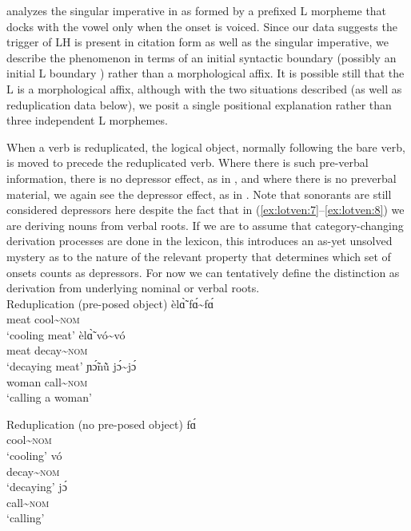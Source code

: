 \documentclass[output=paper,newtxmath,modfonts,nonflat,hidelinks]{langsci/langscibook}
\begin{document}
\citet{Bradshaw1999} analyzes the singular imperative in  as formed by a prefixed L  morpheme that docks with the vowel only when the onset is voiced. Since our data suggests the trigger of LH is present in citation form as well as the singular imperative, we describe the phenomenon in terms of an initial syntactic boundary (possibly an initial L boundary ) rather than a morphological affix. It is possible still that the L  is a morphological affix, although with the two situations described (as well as reduplication data below), we posit a single positional explanation rather than three independent L  morphemes. 

When a verb is reduplicated, the logical object, normally following the bare verb, is moved to precede the reduplicated verb. Where there is such pre-verbal information, there is no depressor effect, as in , and where there is no preverbal material, we again see the depressor effect, as in . Note that sonorants are still considered depressors here despite the fact that in (\ref{ex:lotven:7}--\ref{ex:lotven:8}) we are deriving nouns from verbal roots. If we are to assume that category-changing derivation processes are done in the lexicon, this introduces an as-yet unsolved mystery as to the nature of the relevant property that determines which set of onsets counts as depressors. For now we can tentatively define the distinction as derivation from underlying nominal or verbal roots. 
\\
\ea\label{ex:lotven:7}Reduplication (pre-posed object)
\ea\label{ex:lotven:7a}
    \gll èlɑ̃̀ {fɑ́}{\textasciitilde}fɑ́\\
    meat  cool{\textasciitilde}\textsc{nom} \\
    \glt ‘cooling meat’
\ex\label{ex:lotven:7b}
	\gll èlɑ̃̀ {vó}{\textasciitilde}vó\\
    meat decay{\textasciitilde}\textsc{nom}\\
    \glt ‘decaying meat’
\ex\label{ex:lotven:7c}
	\gll ɲɔ̃́nũ̀ {jɔ́}{\textasciitilde}jɔ́\\
	woman call{\textasciitilde}\textsc{nom}\\
    \glt ‘calling a woman’
\z
\z

\ea\label{ex:lotven:8}Reduplication (no pre-posed object)
\ea\label{ex:lotven:8a}    
    fɑ́\\
    cool{\textasciitilde}\textsc{nom}    \\
    \glt ‘cooling’
\ex\label{ex:lotven:8b}
	vó\\
    decay{\textasciitilde}\textsc{nom}\\
    \glt ‘decaying’
\ex\label{ex:lotven:8c}
	jɔ́\\
    call{\textasciitilde}\textsc{nom} \\
    \glt ‘calling’
\z
\z
\end{document}

